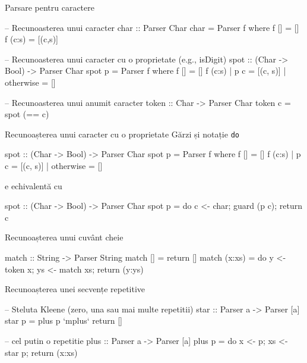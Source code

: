 \documentclass[xcolor=pdftex,romanian,colorlinks]{beamer}
\begin{document}
%

\begin{frame}[fragile]{Parsare pentru caractere}
\begin{asciihs}
  -- Recunoasterea unui caracter
  char :: Parser Char
  char = Parser f
    where
    f []     = []
    f (c:s) = [(c,s)]

  -- Recunoasterea unui caracter cu o proprietate (e.g., isDigit)
  spot :: (Char -> Bool) -> Parser Char
  spot p = Parser f
    where
    f []                 = []
    f (c:s) | p c        = [(c, s)]
            | otherwise = []

  -- Recunoasterea unui anumit caracter
  token :: Char -> Parser Char
  token c = spot (== c)
\end{asciihs}
\end{frame}




\begin{frame}[fragile]{Recunoașterea unui caracter cu o proprietate}
{Gărzi și notație \lstinline$do$}
\begin{asciihs}
  spot :: (Char -> Bool) -> Parser Char
  spot p = Parser f
    where
    f []                 = []
    f (c:s) | p c        = [(c, s)]
            | otherwise = []
\end{asciihs}
e echivalentă cu
\begin{asciihs}
  spot :: (Char -> Bool) -> Parser Char
  spot p = do { c <- char; guard (p c); return c }
\end{asciihs}
\end{frame}

\begin{frame}[fragile]{Recunoașterea unui cuvânt cheie}
\begin{asciihs}
  match :: String -> Parser String
  match []      = return []
  match (x:xs) = do
                     y <- token x;
                     ys <- match xs;
                     return (y:ys)
\end{asciihs}
\end{frame}



\begin{frame}[fragile]{Recunoașterea unei secvențe repetitive}
\begin{asciihs}
  -- Steluta Kleene (zero, una sau mai multe repetitii)
  star :: Parser a -> Parser [a]
  star p = plus p `mplus` return []

  -- cel putin o repetitie
  plus :: Parser a -> Parser [a]
  plus p = do { x <- p;
                xs <- star p;
                return (x:xs) }
\end{asciihs}
\end{frame}
\end{document}
